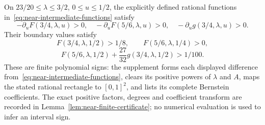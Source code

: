 \begin{lemma}[Bounds for $F$ and $g$ at $\rho=3/4$ and $\rho=5/6$]\label{lem:near-intermediate-arithmetic}
On $23/20\le\lambda\le3/2$, $0\le u\le1/2$, the explicitly defined rational functions in~\eqref{eq:near-intermediate-functions} satisfy
\[
 -\partial_uF(3/4,\lambda,u)>0,\quad
 -\partial_uF(5/6,\lambda,u)>0,\quad
 -\partial_ug(3/4,\lambda,u)>0.
\]
Their boundary values satisfy
\[
 F(3/4,\lambda,1/2)>1/8,\qquad
 F(5/6,\lambda,1/4)>0,
\]
\[
 F(5/6,\lambda,1/2)+\frac{27}{32}g(3/4,\lambda,1/2)>1/100.
\]
These are finite polynomial signs: the supplement forms each displayed difference from~\eqref{eq:near-intermediate-functions}, clears its positive powers of $\lambda$ and $A$, maps the stated rational rectangle to $[0,1]^2$, and lists its complete Bernstein coefficients. The exact positive factors, degrees and coefficient transform are recorded in Lemma~\ref{lem:near-finite-certificate}; no numerical evaluation is used to infer an interval sign.
\end{lemma}

